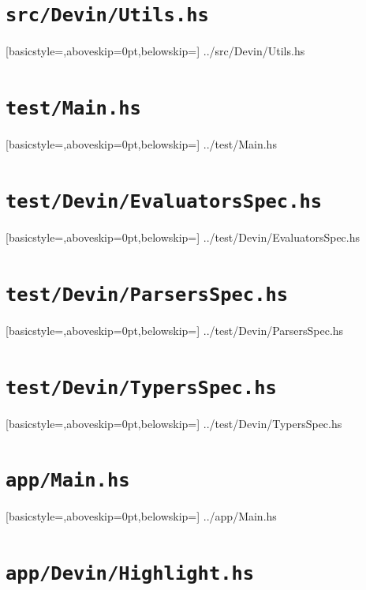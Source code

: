 \documentclass[UdineBachThesis,american,11pt]{PhdThesis}
\begin{document}
  \section{\texttt{src/Devin/Utils.hs}}

  
    [basicstyle=\ttfamily\footnotesize,aboveskip=0pt,belowskip=\baselineskip]
    {../src/Devin/Utils.hs}

  \section{\texttt{test/Main.hs}}

  
    [basicstyle=\ttfamily\footnotesize,aboveskip=0pt,belowskip=\baselineskip]
    {../test/Main.hs}

  \section{\texttt{test/Devin/EvaluatorsSpec.hs}}

  
    [basicstyle=\ttfamily\footnotesize,aboveskip=0pt,belowskip=\baselineskip]
    {../test/Devin/EvaluatorsSpec.hs}

  \section{\texttt{test/Devin/ParsersSpec.hs}}

  
    [basicstyle=\ttfamily\footnotesize,aboveskip=0pt,belowskip=\baselineskip]
    {../test/Devin/ParsersSpec.hs}

  \section{\texttt{test/Devin/TypersSpec.hs}}

  
    [basicstyle=\ttfamily\footnotesize,aboveskip=0pt,belowskip=\baselineskip]
    {../test/Devin/TypersSpec.hs}

  \section{\texttt{app/Main.hs}}
  \label{section:app-main-hs}

  
    [basicstyle=\ttfamily\footnotesize,aboveskip=0pt,belowskip=\baselineskip]
    {../app/Main.hs}

  \section{\texttt{app/Devin/Highlight.hs}}
\end{document}
